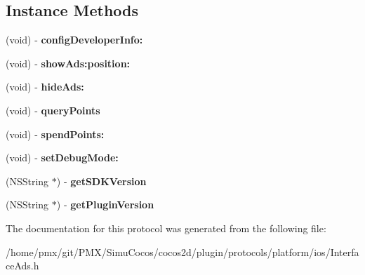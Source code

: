 \subsection*{Instance Methods}
\begin{DoxyCompactItemize}
\item 
\mbox{\label{protocolInterfaceAds_01-p_a4f917ca74b7feda46bc6026ad3ab5219}} 
(void) -\/ {\bfseries config\+Developer\+Info\+:}
\item 
\mbox{\label{protocolInterfaceAds_01-p_aedfb0e7279f455530c0e2b0fa7bf71ea}} 
(void) -\/ {\bfseries show\+Ads\+:position\+:}
\item 
\mbox{\label{protocolInterfaceAds_01-p_ace4d56bb0186e382ced1eca5929140f1}} 
(void) -\/ {\bfseries hide\+Ads\+:}
\item 
\mbox{\label{protocolInterfaceAds_01-p_a27d1d6a486eaf068e720fafabfbe1e08}} 
(void) -\/ {\bfseries query\+Points}
\item 
\mbox{\label{protocolInterfaceAds_01-p_a79d7fc1916c52aa25188a758be574e20}} 
(void) -\/ {\bfseries spend\+Points\+:}
\item 
\mbox{\label{protocolInterfaceAds_01-p_aa896a29582014ab8601880a10b09885e}} 
(void) -\/ {\bfseries set\+Debug\+Mode\+:}
\item 
\mbox{\label{protocolInterfaceAds_01-p_a156ca25cd5b2cbab14690208398481d1}} 
(N\+S\+String $\ast$) -\/ {\bfseries get\+S\+D\+K\+Version}
\item 
\mbox{\label{protocolInterfaceAds_01-p_ae3db482c4d626008fd11cbde1a061754}} 
(N\+S\+String $\ast$) -\/ {\bfseries get\+Plugin\+Version}
\end{DoxyCompactItemize}


The documentation for this protocol was generated from the following file\+:\begin{DoxyCompactItemize}
\item 
/home/pmx/git/\+P\+M\+X/\+Simu\+Cocos/cocos2d/plugin/protocols/platform/ios/Interface\+Ads.\+h\end{DoxyCompactItemize}
